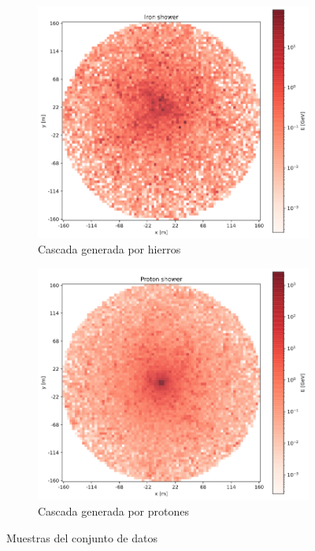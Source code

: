 \begin{figure}[h]
     \centering
     \begin{subfigure}[b]{0.45\textwidth}
         \centering
         \includegraphics[width=\textwidth]{imagenes/01_Introduccion/iron.png}
         \caption{Cascada generada por hierros}
         \label{fig:y equals x}
     \end{subfigure}
     \hfill
     \begin{subfigure}[b]{0.45\textwidth}
         \centering
         \includegraphics[width=\textwidth]{imagenes/01_Introduccion/proton.png}
         \caption{Cascada generada por protones}
         \label{fig:three sin x}
     \end{subfigure}
        \caption{Muestras del conjunto de datos}
        \label{fig:three graphs}
\end{figure}

